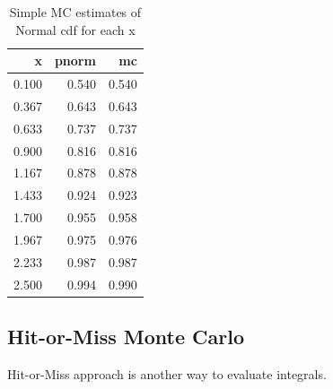 \documentclass[]{book}
\newenvironment{Shaded}{\begin{snugshade}}{\end{snugshade}}
\newcommand{\DataTypeTok}[1]{\textcolor[rgb]{0.13,0.29,0.53}{#1}}
\newcommand{\DecValTok}[1]{\textcolor[rgb]{0.00,0.00,0.81}{#1}}
\newcommand{\FloatTok}[1]{\textcolor[rgb]{0.00,0.00,0.81}{#1}}
\newcommand{\KeywordTok}[1]{\textcolor[rgb]{0.13,0.29,0.53}{\textbf{#1}}}
\newcommand{\NormalTok}[1]{#1}
\newcommand{\OperatorTok}[1]{\textcolor[rgb]{0.81,0.36,0.00}{\textbf{#1}}}
\newcommand{\StringTok}[1]{\textcolor[rgb]{0.31,0.60,0.02}{#1}}
\theoremstyle{definition}
\theoremstyle{definition}
\theoremstyle{definition}
\theoremstyle{remark}
\begin{document}
\begin{Shaded}
\end{Shaded}

\begin{longtable}{r|r|r}
\caption{\label{tab:unnamed-chunk-38}Simple MC estimates of Normal cdf for each x}\\
\hline
x & pnorm & mc\\
\hline
0.100 & 0.540 & 0.540\\
\hline
0.367 & 0.643 & 0.643\\
\hline
0.633 & 0.737 & 0.737\\
\hline
0.900 & 0.816 & 0.816\\
\hline
1.167 & 0.878 & 0.878\\
\hline
1.433 & 0.924 & 0.923\\
\hline
1.700 & 0.955 & 0.958\\
\hline
1.967 & 0.975 & 0.976\\
\hline
2.233 & 0.987 & 0.987\\
\hline
2.500 & 0.994 & 0.990\\
\hline
\end{longtable}

\hypertarget{hit-or-miss-monte-carlo}{%
\subsection{Hit-or-Miss Monte Carlo}\label{hit-or-miss-monte-carlo}}

Hit-or-Miss approach is another way to evaluate integrals.
\end{document}
